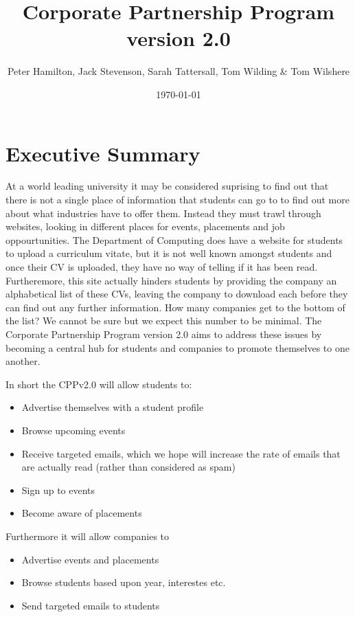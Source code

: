 \documentclass{article}
\begin{document}
\title{Corporate Partnership Program version 2.0}
\author{Peter Hamilton, Jack Stevenson, Sarah Tattersall, Tom Wilding \& Tom Wilshere}
\date{\today}         %
\maketitle            %
\pagebreak

\section{Executive Summary}
At a world leading university it may be considered suprising to find out that there is not a single place of information that students can go to to find out more about what industries have to offer them. Instead they must trawl through websites, looking in different places for events, placements and job oppourtunities.
The Department of Computing does have a website for students to upload a curriculum vitate, but it is not well known amongst students and once their CV is uploaded, they have no way of telling if it has been read.
Furtheremore, this site actually hinders students by providing the company an alphabetical list of these CVs, leaving the company to download each before they can find out any further information. How many companies get to the bottom of the list? We cannot be sure but we expect this number to be minimal.
The Corporate Partnership Program version 2.0 aims to address these issues by becoming a central hub for students and companies to promote themselves to one another.

In short the CPPv2.0 will allow students to:

\begin{itemize}
  \item Advertise themselves with a student profile
  \item Browse upcoming events
  \item Receive targeted emails, which we hope will increase the rate of emails that are actually read (rather than considered as spam)
  \item Sign up to events
  \item Become aware of placements
\end{itemize}

Furthermore it will allow companies to

\begin{itemize}
  \item Advertise events and placements
  \item Browse students based upon year, interestes etc.
  \item Send targeted emails to students
\end{itemize}
\end{document}
